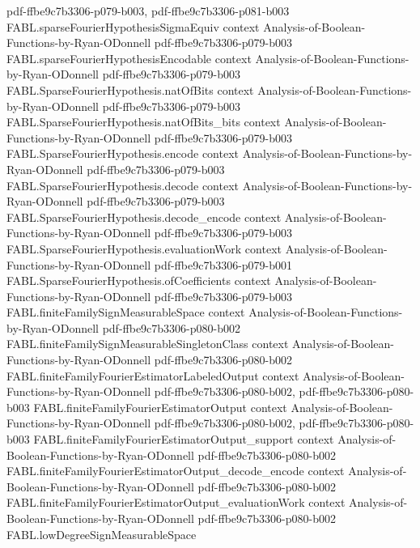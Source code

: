 \begin{theorem}
  {pdf-ffbe9c7b3306-p079-b003,
    pdf-ffbe9c7b3306-p081-b003}
\proofstep
  {FABL.sparseFourierHypothesisSigmaEquiv}
  {context}
  {Analysis-of-Boolean-Functions-by-Ryan-ODonnell}
  {pdf-ffbe9c7b3306-p079-b003}
\proofstep
  {FABL.sparseFourierHypothesisEncodable}
  {context}
  {Analysis-of-Boolean-Functions-by-Ryan-ODonnell}
  {pdf-ffbe9c7b3306-p079-b003}
\proofstep
  {FABL.SparseFourierHypothesis.natOfBits}
  {context}
  {Analysis-of-Boolean-Functions-by-Ryan-ODonnell}
  {pdf-ffbe9c7b3306-p079-b003}
\proofstep
  {FABL.SparseFourierHypothesis.natOfBits_bits}
  {context}
  {Analysis-of-Boolean-Functions-by-Ryan-ODonnell}
  {pdf-ffbe9c7b3306-p079-b003}
\proofstep
  {FABL.SparseFourierHypothesis.encode}
  {context}
  {Analysis-of-Boolean-Functions-by-Ryan-ODonnell}
  {pdf-ffbe9c7b3306-p079-b003}
\proofstep
  {FABL.SparseFourierHypothesis.decode}
  {context}
  {Analysis-of-Boolean-Functions-by-Ryan-ODonnell}
  {pdf-ffbe9c7b3306-p079-b003}
\proofstep
  {FABL.SparseFourierHypothesis.decode_encode}
  {context}
  {Analysis-of-Boolean-Functions-by-Ryan-ODonnell}
  {pdf-ffbe9c7b3306-p079-b003}
\proofstep
  {FABL.SparseFourierHypothesis.evaluationWork}
  {context}
  {Analysis-of-Boolean-Functions-by-Ryan-ODonnell}
  {pdf-ffbe9c7b3306-p079-b001}
\proofstep
  {FABL.SparseFourierHypothesis.ofCoefficients}
  {context}
  {Analysis-of-Boolean-Functions-by-Ryan-ODonnell}
  {pdf-ffbe9c7b3306-p079-b003}
\proofstep
  {FABL.finiteFamilySignMeasurableSpace}
  {context}
  {Analysis-of-Boolean-Functions-by-Ryan-ODonnell}
  {pdf-ffbe9c7b3306-p080-b002}
\proofstep
  {FABL.finiteFamilySignMeasurableSingletonClass}
  {context}
  {Analysis-of-Boolean-Functions-by-Ryan-ODonnell}
  {pdf-ffbe9c7b3306-p080-b002}
\proofstep
  {FABL.finiteFamilyFourierEstimatorLabeledOutput}
  {context}
  {Analysis-of-Boolean-Functions-by-Ryan-ODonnell}
  {pdf-ffbe9c7b3306-p080-b002,
    pdf-ffbe9c7b3306-p080-b003}
\proofstep
  {FABL.finiteFamilyFourierEstimatorOutput}
  {context}
  {Analysis-of-Boolean-Functions-by-Ryan-ODonnell}
  {pdf-ffbe9c7b3306-p080-b002,
    pdf-ffbe9c7b3306-p080-b003}
\proofstep
  {FABL.finiteFamilyFourierEstimatorOutput_support}
  {context}
  {Analysis-of-Boolean-Functions-by-Ryan-ODonnell}
  {pdf-ffbe9c7b3306-p080-b002}
\proofstep
  {FABL.finiteFamilyFourierEstimatorOutput_decode_encode}
  {context}
  {Analysis-of-Boolean-Functions-by-Ryan-ODonnell}
  {pdf-ffbe9c7b3306-p080-b002}
\proofstep
  {FABL.finiteFamilyFourierEstimatorOutput_evaluationWork}
  {context}
  {Analysis-of-Boolean-Functions-by-Ryan-ODonnell}
  {pdf-ffbe9c7b3306-p080-b002}
\proofstep
  {FABL.lowDegreeSignMeasurableSpace}

\end{theorem}
